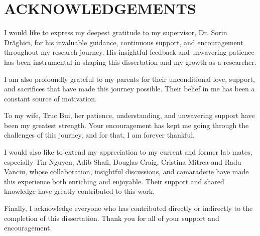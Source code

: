 \documentclass[Minh_PhD_thesis.tex]{subfiles}
\begin{document}
\section*{ACKNOWLEDGEMENTS}


I would like to express my deepest gratitude to my supervisor, Dr. Sorin Dr\u{a}ghici, for his invaluable guidance, continuous support, and encouragement throughout my research journey. His insightful feedback and unwavering patience has been instrumental in shaping this dissertation and my growth as a researcher.

I am also profoundly grateful to my parents for their unconditional love, support, and sacrifices that have made this journey possible. Their belief in me has been a constant source of motivation.

To my wife, Truc Bui, her patience, understanding, and unwavering support have been my greatest strength. Your encouragement has kept me going through the challenges of this journey, and for that, I am forever thankful.

I would also like to extend my appreciation to my current and former lab mates, especially Tin Nguyen, Adib Shafi, Douglas Craig, Cristina Mitrea and Radu Vanciu, whose collaboration, insightful discussions, and camaraderie have made this experience both enriching and enjoyable. Their support and shared knowledge have greatly contributed to this work.

Finally, I acknowledge everyone who has contributed directly or indirectly to the completion of this dissertation. Thank you for all of your support and encouragement.

\end{document}
